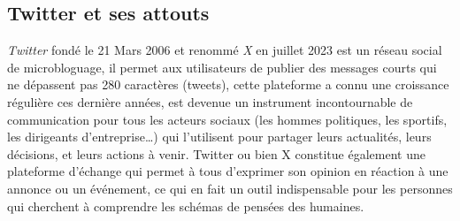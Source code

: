 \subsection{Twitter et ses attouts}
\textit{Twitter} fondé le 21 Mars 2006 et renommé \textit{X }en juillet 2023 est un réseau social de microbloguage, il permet aux utilisateurs de publier des messages courts qui ne dépassent pas 280 caractères (tweets), cette plateforme a connu une croissance régulière ces dernière années, est devenue un instrument incontournable de communication pour tous les acteurs sociaux (les hommes politiques, les sportifs, les dirigeants d’entreprise…) qui l’utilisent pour partager leurs actualités, leurs décisions, et leurs actions à venir. Twitter ou bien X constitue également une plateforme d’échange qui permet à tous d’exprimer son opinion en réaction à une annonce ou un événement, ce qui en fait un outil indispensable pour les personnes qui cherchent à comprendre les schémas de pensées des humaines.

